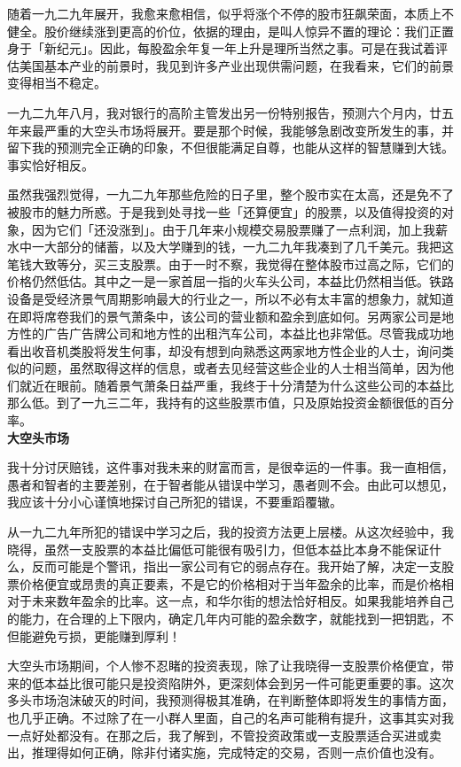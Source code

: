 \documentclass[UTF8,a4paper,zihao=-4,fontset = windows]{ctexart} %
\begin{document}
随着一九二九年展开，我愈来愈相信，似乎将涨个不停的股市狂飙荣面，本质上不健全。股价继续涨到更高的价位，依据的理由，是叫人惊异不置的理论：我们正置身于「新纪元」。因此，每股盈余年复一年上升是理所当然之事。可是在我试着评估美国基本产业的前景时，我见到许多产业出现供需问题，在我看来，它们的前景变得相当不稳定。

一九二九年八月，我对银行的高阶主管发出另一份特别报告，预测六个月内，廿五年来最严重的大空头市场将展开。要是那个时候，我能够急剧改变所发生的事，并留下我的预测完全正确的印象，不但很能满足自尊，也能从这样的智慧赚到大钱。事实恰好相反。

虽然我强烈觉得，一九二九年那些危险的日子里，整个股市实在太高，还是免不了被股市的魅力所惑。于是我到处寻找一些「还算便宜」的股票，以及值得投资的对象，因为它们「还没涨到」。由于几年来小规模交易股票赚了一点利润，加上我薪水中一大部分的储蓄，以及大学赚到的钱，一九二九年我凑到了几千美元。我把这笔钱大致等分，买三支股票。由于一时不察，我觉得在整体股市过高之际，它们的价格仍然低估。其中之一是一家首屈一指的火车头公司，本益比仍然相当低。铁路设备是受经济景气周期影响最大的行业之一，所以不必有太丰富的想象力，就知道在即将席卷我们的景气萧条中，该公司的营业额和盈余到底如何。另两家公司是地方性的广告广告牌公司和地方性的出租汽车公司，本益比也非常低。尽管我成功地看出收音机类股将发生何事，却没有想到向熟悉这两家地方性企业的人士，询问类似的问题，虽然取得这样的信息，或者去见经营这些企业的人士相当简单，因为他们就近在眼前。随着景气萧条日益严重，我终于十分清楚为什么这些公司的本益比那么低。到了一九三二年，我持有的这些股票市值，只及原始投资金额很低的百分率。
\\

\textbf{大空头市场}


我十分讨厌赔钱，这件事对我未来的财富而言，是很幸运的一件事。我一直相信，愚者和智者的主要差别，在于智者能从错误中学习，愚者则不会。由此可以想见，我应该十分小心谨慎地探讨自己所犯的错误，不要重蹈覆辙。

从一九二九年所犯的错误中学习之后，我的投资方法更上层楼。从这次经验中，我晓得，虽然一支股票的本益比偏低可能很有吸引力，但低本益比本身不能保证什么，反而可能是个警讯，指出一家公司有它的弱点存在。我开始了解，决定一支股票价格便宜或昂贵的真正要素，不是它的价格相对于当年盈余的比率，而是价格相对于未来数年盈余的比率。这一点，和华尔街的想法恰好相反。如果我能培养自己的能力，在合理的上下限内，确定几年内可能的盈余数字，就能找到一把钥匙，不但能避免亏损，更能赚到厚利！

大空头市场期间，个人惨不忍睹的投资表现，除了让我晓得一支股票价格便宜，带来的低本益比很可能只是投资陷阱外，更深刻体会到另一件可能更重要的事。这次多头市场泡沫破灭的时间，我预测得极其准确，在判断整体即将发生的事情方面，也几乎正确。不过除了在一小群人里面，自己的名声可能稍有提升，这事其实对我一点好处都没有。在那之后，我了解到，不管投资政策或一支股票适合买进或卖出，推理得如何正确，除非付诸实施，完成特定的交易，否则一点价值也没有。
\\
\end{document}
